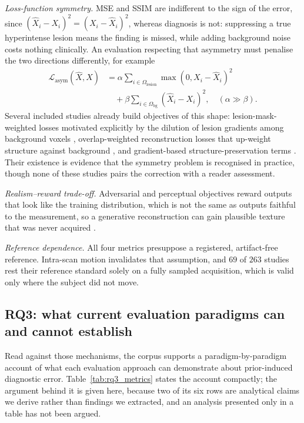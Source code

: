 \documentclass[review,authoryear]{elsarticle}
\begin{document}
\emph{Loss-function symmetry.} MSE and SSIM are indifferent to the sign of the error,
since $(\hat{X}_i - X_i)^2 = (X_i - \hat{X}_i)^2$, whereas diagnosis is not: suppressing
a true hyperintense lesion means the finding is missed, while adding background noise
costs nothing clinically. An evaluation respecting that asymmetry must penalise the two
directions differently, for example
\begin{equation}
\begin{aligned}
\mathcal{L}_{\text{asym}}(\hat{X}, X) &= \alpha \sum_{i \in \Omega_{\text{lesion}}}
\max(0, X_i - \hat{X}_i)^2 \\
&\quad + \beta \sum_{i \in \Omega_{\text{bg}}} (\hat{X}_i - X_i)^2,
\quad (\alpha \gg \beta).
\end{aligned}
\end{equation}
Several included studies already build objectives of this shape: lesion-mask-weighted
losses motivated explicitly by the dilution of lesion gradients among background voxels
\citep{junhyeok2026lesionaware}, overlap-weighted reconstruction losses that up-weight
structure against background
\citep{nivetha2023sadir}, and gradient-based structure-preservation terms
\citep{zhang2026iterative}. Their existence is evidence that the symmetry problem is
recognised in practice, though none of these studies pairs the correction with a reader
assessment.

\emph{Realism--reward trade-off.} Adversarial and perceptual objectives reward outputs
that look like the training distribution, which is not the same as outputs faithful to
the measurement, so a generative reconstruction can gain plausible texture that was
never acquired \citep{zhou2024adversarial,bhadra2021hallucinations}.

\emph{Reference dependence.} All four metrics presuppose a registered, artifact-free
reference. Intra-scan motion invalidates that assumption, and $69$ of $263$ studies
rest their reference standard solely on a fully sampled acquisition, which is valid only
where the subject did not move.

\subsection{RQ3: what current evaluation paradigms can and cannot establish}
\label{res:rq3}
Read against those mechanisms, the corpus supports a paradigm-by-paradigm account of
what each evaluation approach can demonstrate about prior-induced diagnostic error.
Table~\ref{tab:rq3_metrics} states the account compactly; the argument behind it is
given here, because two of its six rows are analytical claims we derive rather than
findings we extracted, and an analysis presented only in a table has not been argued.
\end{document}
